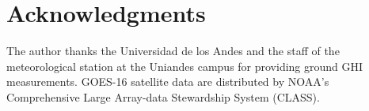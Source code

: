 \documentclass[lettersize,journal]{IEEEtran}
\begin{document}







\section*{Acknowledgments}
The author thanks the Universidad de los Andes and the staff of the meteorological
station at the Uniandes campus for providing ground GHI measurements.
GOES-16 satellite data are distributed by NOAA's Comprehensive Large Array-data
Stewardship System (CLASS).



\end{document}
